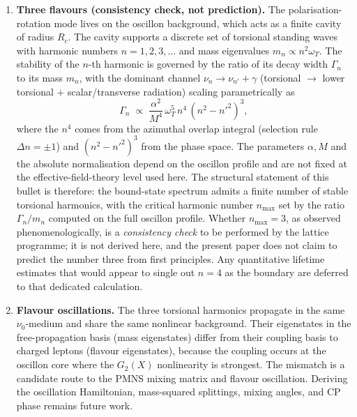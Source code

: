 \documentclass[11pt]{article}
\begin{document}
\begin{enumerate}
  \item \textbf{Three flavours (consistency check,
    not prediction).}\;
    The polarisation-rotation mode lives on the
    oscillon background, which acts as a finite
    cavity of radius $R_c$.  The cavity supports
    a discrete set of torsional standing waves
    with harmonic numbers $n = 1, 2, 3, \ldots$
    and mass eigenvalues
    $m_n \propto n^2 \omega_T$.
    The stability of the $n$-th harmonic is
    governed by the ratio of its decay width
    $\Gamma_n$ to its mass $m_n$, with the
    dominant channel
    $\nu_n \to \nu_{n'} + \gamma$ (torsional
    $\to$ lower torsional $+$ scalar/transverse
    radiation) scaling parametrically as
    \begin{equation}\label{eq:torsion_decay}
      \Gamma_n \;\propto\;
      \frac{\alpha^2}{M^4}\,\omega_T^5\,n^4\,
      (n^2 - n'^2)^3,
    \end{equation}
    where the $n^4$ comes from the azimuthal
    overlap integral (selection rule
    $\Delta n = \pm 1$) and $(n^2 - n'^2)^3$
    from the phase space.  The parameters
    $\alpha, M$ and the absolute
    normalisation depend on the oscillon
    profile and are not fixed at the
    effective-field-theory level used here.
    The structural statement of this bullet is
    therefore: the bound-state spectrum
    admits a finite number of stable
    torsional harmonics, with the critical
    harmonic number $n_{\mathrm{max}}$ set by
    the ratio $\Gamma_n/m_n$ computed on the
    full oscillon profile.  Whether
    $n_{\mathrm{max}}=3$, as observed
    phenomenologically, is a
    \emph{consistency check} to be performed
    by the lattice programme; it is not
    derived here, and the present paper does
    not claim to predict the number three from
    first principles.  Any quantitative
    lifetime estimates that would appear to
    single out $n=4$ as the boundary are
    deferred to that dedicated calculation.

  \item \textbf{Flavour oscillations.}\;
    The three torsional harmonics propagate in
    the same $\nu_0$-medium and share the same
    nonlinear background.  Their eigenstates in
    the free-propagation basis (mass eigenstates)
    differ from their coupling basis to charged
    leptons (flavour eigenstates), because the
    coupling occurs at the oscillon core where
    the $G_2(X)$ nonlinearity is strongest.
    The mismatch is a candidate route to the PMNS
    mixing matrix and flavour oscillation.  Deriving
    the oscillation Hamiltonian, mass-squared
    splittings, mixing angles, and CP phase remains
    future work.


\end{enumerate}
\end{document}
